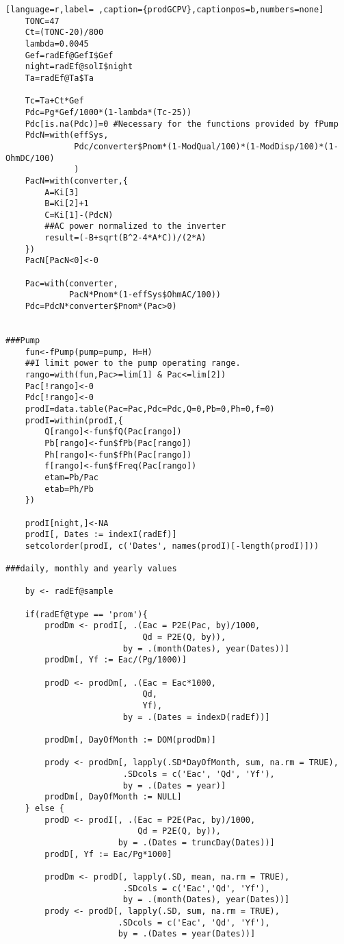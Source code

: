 \begin{lstlisting}[language=r,label= ,caption={prodGCPV},captionpos=b,numbers=none]
    TONC=47
    Ct=(TONC-20)/800
    lambda=0.0045
    Gef=radEf@GefI$Gef
    night=radEf@solI$night
    Ta=radEf@Ta$Ta

    Tc=Ta+Ct*Gef
    Pdc=Pg*Gef/1000*(1-lambda*(Tc-25))
    Pdc[is.na(Pdc)]=0 #Necessary for the functions provided by fPump
    PdcN=with(effSys,
              Pdc/converter$Pnom*(1-ModQual/100)*(1-ModDisp/100)*(1-OhmDC/100)
              )
    PacN=with(converter,{
        A=Ki[3]
        B=Ki[2]+1
        C=Ki[1]-(PdcN)
        ##AC power normalized to the inverter
        result=(-B+sqrt(B^2-4*A*C))/(2*A)
    })
    PacN[PacN<0]<-0

    Pac=with(converter,
             PacN*Pnom*(1-effSys$OhmAC/100))
    Pdc=PdcN*converter$Pnom*(Pac>0)


###Pump
    fun<-fPump(pump=pump, H=H)
    ##I limit power to the pump operating range.
    rango=with(fun,Pac>=lim[1] & Pac<=lim[2]) 
    Pac[!rango]<-0
    Pdc[!rango]<-0
    prodI=data.table(Pac=Pac,Pdc=Pdc,Q=0,Pb=0,Ph=0,f=0)	
    prodI=within(prodI,{
        Q[rango]<-fun$fQ(Pac[rango])
        Pb[rango]<-fun$fPb(Pac[rango])
        Ph[rango]<-fun$fPh(Pac[rango])
        f[rango]<-fun$fFreq(Pac[rango])
        etam=Pb/Pac
        etab=Ph/Pb
    })

    prodI[night,]<-NA
    prodI[, Dates := indexI(radEf)]
    setcolorder(prodI, c('Dates', names(prodI)[-length(prodI)]))

###daily, monthly and yearly values

    by <- radEf@sample

    if(radEf@type == 'prom'){
        prodDm <- prodI[, .(Eac = P2E(Pac, by)/1000,
                            Qd = P2E(Q, by)),
                        by = .(month(Dates), year(Dates))]
        prodDm[, Yf := Eac/(Pg/1000)]

        prodD <- prodDm[, .(Eac = Eac*1000,
                            Qd,
                            Yf),
                        by = .(Dates = indexD(radEf))]

        prodDm[, DayOfMonth := DOM(prodDm)]

        prody <- prodDm[, lapply(.SD*DayOfMonth, sum, na.rm = TRUE),
                        .SDcols = c('Eac', 'Qd', 'Yf'),
                        by = .(Dates = year)]
        prodDm[, DayOfMonth := NULL]
    } else {
        prodD <- prodI[, .(Eac = P2E(Pac, by)/1000,
                           Qd = P2E(Q, by)),
                       by = .(Dates = truncDay(Dates))]
        prodD[, Yf := Eac/Pg*1000]

        prodDm <- prodD[, lapply(.SD, mean, na.rm = TRUE),
                        .SDcols = c('Eac','Qd', 'Yf'),
                        by = .(month(Dates), year(Dates))]
        prody <- prodD[, lapply(.SD, sum, na.rm = TRUE),
                       .SDcols = c('Eac', 'Qd', 'Yf'),
                       by = .(Dates = year(Dates))]


\end{lstlisting}
